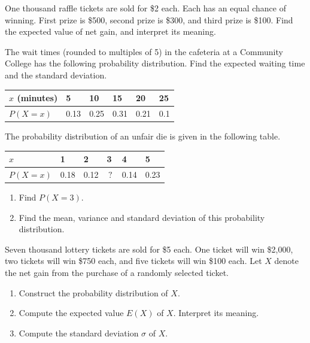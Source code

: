 \begin{example}

One thousand raffle tickets are sold for \$2 each. Each has an equal
chance of winning. First prize is \$500, second prize is \$300, and
third prize is \$100. Find the expected value of net gain, and interpret
its meaning.

\end{example}

\begin{example}

The wait times (rounded to multiples of 5) in the cafeteria at a
Community College has the following probability distribution. Find the
expected waiting time and the standard deviation.

\begin{longtable}[]{@{}llllll@{}}
\toprule()
\(x\) (minutes) & 5 & 10 & 15 & 20 & 25 \\
\midrule()
\endhead
\(P(X=x)\) & 0.13 & 0.25 & 0.31 & 0.21 & 0.1 \\
\bottomrule()
\end{longtable}

\end{example}

\begin{example}

The probability distribution of an unfair die is given in the following
table.

\begin{longtable}[]{@{}llllll@{}}
\toprule()
\(x\) & 1 & 2 & 3 & 4 & 5 \\
\midrule()
\endhead
\(P(X=x)\) & 0.18 & 0.12 & \(\,?\,\) & 0.14 & 0.23 \\
\bottomrule()
\end{longtable}

\begin{enumerate}
\item
  Find \(P(X=3)\).
\item
  Find the mean, variance and standard deviation of this probability
  distribution.
\end{enumerate}

\end{example}

\begin{exercise}

Seven thousand lottery tickets are sold for \$5 each. One ticket will
win \$2,000, two tickets will win \$750 each, and five tickets will win
\$100 each. Let \(X\) denote the net gain from the purchase of a
randomly selected ticket.

\begin{enumerate}
\item
  Construct the probability distribution of \(X\).
\item
  Compute the expected value \(E(X)\) of \(X\). Interpret its meaning.
\item
  Compute the standard deviation \(\sigma\) of \(X\).
\end{enumerate}

\end{exercise}

